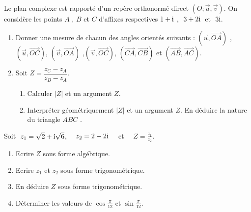 \begin{exercice}
 Le plan complexe  est rapporté  d'un repère orthonormé direct  $ (O ;\overrightarrow{u},\overrightarrow{v}) $. 
On considère les points  $ A$  , $B $ et $  C $  d'affixes respectives $ 1 +\text{i}$  , $ \; 3+2\text{i}  \; $  \; et  \; $ \; 3\text{i}  $.
\begin{enumerate}
\item Donner une mesure de chacun des angles  orientés suivants :
  $ (\overrightarrow{u} , \overrightarrow{OA} )$ , $ (\overrightarrow{u} , \overrightarrow{OC} )$,  $ (\overrightarrow{v} , \overrightarrow{OA} )$ ,$ (\overrightarrow{v} , \overrightarrow{OC} )$, $ (\overrightarrow{CA} , \overrightarrow{CB} )$  et $ (\overrightarrow{AB}, \overrightarrow{AC} )$.
\item  Soit  $ Z = \dfrac{z_{C}-z_{A}}{z_{B}-z_{A}} $.
\begin{enumerate}
 \item Calculer  $  |Z| $ et un argument $ Z $. 
 \item Interpréter géométriquement $  |Z| $ et un argument $ Z $.
  En déduire la nature du triangle $ ABC $ . 
\end{enumerate} 
\end{enumerate} 
 \end{exercice}
\begin{exercice}
Soit  $\; z_1=\sqrt{2}+\text{i}\sqrt{6} $, $\quad z_2=2-2\text{i}\quad $  et   $\quad Z=\frac{z_1}{z_2} $.
    \begin{enumerate} 
   \item Ecrire $ Z $ sous forme algébrique.
  \item Ecrire  $z_1 $ et $ z_2 $  sous forme trigonométrique.
   \item En déduire  $ Z $ sous forme trigonométrique.
   \item Déterminer les valeurs de $\cos \frac{\pi}{12} $ et $\sin \frac{\pi}{12} $.
 \end{enumerate}
 
\end{exercice}

